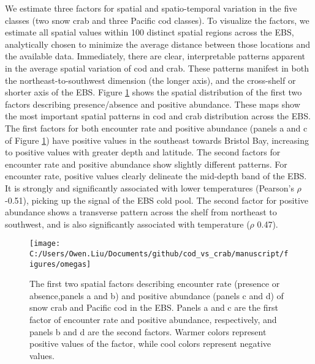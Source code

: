 \documentclass[11pt,]{article}
\begin{document}
We estimate three factors for spatial and spatio-temporal variation in the five classes (two snow crab and three Pacific cod classes). To visualize the factors, we estimate all spatial values within 100 distinct spatial regions across the EBS, analytically chosen to minimize the average distance between those locations and the available data. Immediately, there are clear, interpretable patterns apparent in the average spatial variation of cod and crab. These patterns manifest in both the northeast-to-southwest dimension (the longer axis), and the cross-shelf or shorter axis of the EBS. Figure \ref{fig:omegas} shows the spatial distribution of the first two factors describing presence/absence and positive abundance. These maps show the most important spatial patterns in cod and crab distribution across the EBS. The first factors for both encounter rate and positive abundance (panels a and c of Figure \ref{fig:omegas}) have positive values in the southeast towards Bristol Bay, increasing to positive values with greater depth and latitude. The second factors for encounter rate and positive abundance show slightly different patterns. For encounter rate, positive values clearly delineate the mid-depth band of the EBS. It is strongly and significantly associated with lower temperatures (Pearson's \(\rho\) -0.51), picking up the signal of the EBS cold pool. The second factor for positive abundance shows a transverse pattern across the shelf from northeast to southwest, and is also significantly associated with temperature (\(\rho\) 0.47).

\begin{figure}
\texttt{[image: C:/Users/Owen.Liu/Documents/github/cod\_vs\_crab/manuscript/figures/omegas]} \caption{The first two spatial factors describing encounter rate (presence or absence,panels a and b) and positive abundance (panels c and d) of snow crab and Pacific cod in the EBS. Panels a and c are the first factor of encounter rate and positive abundance, respectively, and panels b and d are the second factors. Warmer colors represent positive values of the factor, while cool colors represent negative values.}\label{fig:omegas}
\end{figure}
\end{document}
